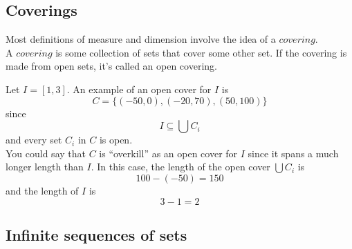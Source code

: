 \documentclass[11pt]{ekblite}
\begin{document}
\subsection{Coverings}
Most definitions of measure and dimension involve the idea of a $\textit{covering}$.
\\[0.2in]A $\textit{covering}$ is some collection of sets that cover some other set. If the covering is made from open sets, it's called an open covering.
\begin{example}
	Let $I = [1,3]$. An example of an open cover for $I$ is
	\[C = \{(-50,0),(-20,70),(50,100)\}\]
	since 
	\[I \subseteq \bigcup C_i\]
	and every set $C_i$ in $C$ is open.
	\\[0.2in]You could say that $C$ is ``overkill'' as an open cover for $I$ since it spans a much longer length than $I$. In this case, the length of the open cover $\bigcup C_i$ is
	\[100 - (-50) = 150\]
	and the length of $I$ is
	\[3 - 1 = 2\]
\end{example}

\subsection{Infinite sequences of sets}
\end{document}
